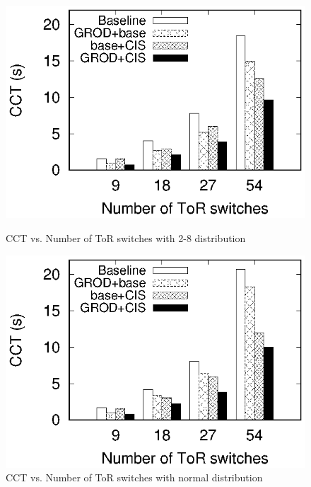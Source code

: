 \begin{figure}
\begin{minipage}[c]{0.23\textwidth}
\includegraphics[width=1\textwidth]{28_count_cct_histogram.eps}
\caption{CCT vs. Number of ToR switches with 2-8 distribution$\qquad\qquad$}\label{fig:28_count_cct_histogram}
\end{minipage}
\hspace{1mm}
\begin{minipage}[c]{0.23\textwidth}
\centering
\includegraphics[width=1\textwidth]{normal_count_cct_histogram.eps}
\caption{CCT vs. Number of ToR switches with normal distribution}\label{fig:normal_count_cct_histogram}
\end{minipage}
\vspace{-0.5cm}
\end{figure}
